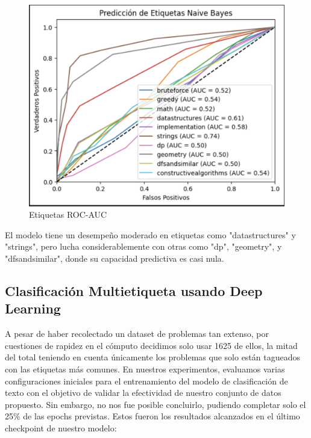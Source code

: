 \documentclass{article}
\begin{document}
\begin{figure}[H]
    \centering
    \includegraphics[scale=0.55]{imgs/roc_auc_knn.png}
    \caption{Etiquetas ROC-AUC}
\end{figure}

El modelo tiene un desempeño moderado en etiquetas como "datastructures" y "strings", pero lucha considerablemente con otras como "dp", "geometry", y "dfsandsimilar", donde su capacidad predictiva es casi nula.

\subsection{Clasificación Multietiqueta usando Deep Learning}

A pesar de haber recolectado un dataset de problemas tan extenso, por cuestiones de 
rapidez en el cómputo decidimos solo usar 1625 de ellos, la mitad 
del total teniendo en cuenta únicamente los problemas que solo están 
tagueados con las etiquetas más comunes. En nuestros experimentos, evaluamos varias configuraciones 
iniciales para el entrenamiento del modelo de clasificación de texto con el objetivo de 
validar la efectividad de nuestro conjunto de datos propuesto. Sin embargo, no nos fue posible 
concluirlo, pudiendo completar solo el 25\% de las epochs previstas. Estos fueron los resultados 
alcanzados en el último checkpoint de nuestro modelo:
\end{document}

